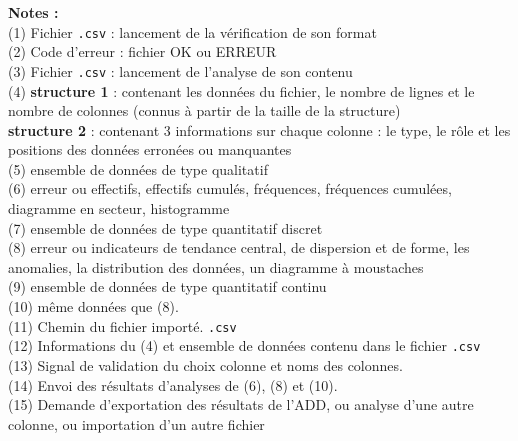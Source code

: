 				\textbf{Notes :}\\
				(1) Fichier \lstinline!.csv! : lancement de la vérification de son format\\
				(2) Code d'erreur : fichier OK ou ERREUR\\
				(3) Fichier \lstinline!.csv! : lancement de l'analyse de son contenu\\
				(4) \textbf{structure 1} : contenant les données du fichier, le nombre de lignes et le nombre de colonnes (connus à partir de la taille de la structure)\\
				\hspace*{1.9em} \textbf{structure 2} : contenant 3 informations sur chaque colonne : le type, le rôle et les positions des données erronées ou manquantes\\
				(5) ensemble de données de type qualitatif\\
				(6) erreur ou effectifs, effectifs cumulés, fréquences, fréquences cumulées, diagramme en secteur, histogramme\\
				(7) ensemble de données de type quantitatif discret\\
				(8) erreur ou indicateurs de tendance central, de dispersion et de forme, les anomalies, la distribution des données, un diagramme à moustaches\\
				(9) ensemble de données de type quantitatif continu\\
				(10) même données que (8).\\
				(11) Chemin du fichier importé. \lstinline!.csv! \\
				(12) Informations du (4) et ensemble de données contenu dans le fichier \lstinline!.csv! \\
				(13) Signal de validation du choix colonne et noms des colonnes.\\
				(14) Envoi des résultats d'analyses de (6), (8) et (10).\\
				(15) Demande d'exportation des résultats de l'ADD, ou analyse d'une autre colonne, ou importation d'un autre fichier\\
			

